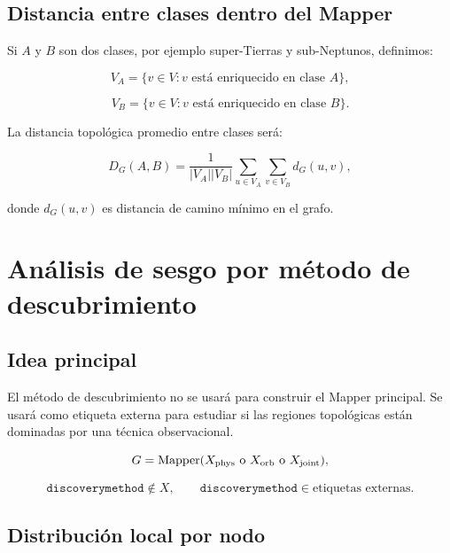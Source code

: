 \documentclass[11pt,letterpaper]{article}
\newcommand{\Mapper}{\operatorname{Mapper}}
\newcommand{\phys}{\rm phys}
\newcommand{\orb}{\rm orb}
\newcommand{\joint}{\rm joint}
\begin{document}
\subsection{Distancia entre clases dentro del Mapper}

Si $A$ y $B$ son dos clases, por ejemplo super-Tierras y sub-Neptunos, definimos:

\begin{equation}
V_A=\{v\in V: v\text{ está enriquecido en clase }A\},
\end{equation}

\begin{equation}
V_B=\{v\in V: v\text{ está enriquecido en clase }B\}.
\end{equation}

La distancia topológica promedio entre clases será:

\begin{equation}
D_G(A,B)=\frac{1}{|V_A||V_B|}\sum_{u\in V_A}\sum_{v\in V_B}d_G(u,v),
\end{equation}

donde $d_G(u,v)$ es distancia de camino mínimo en el grafo.

\section{Análisis de sesgo por método de descubrimiento}

\subsection{Idea principal}

El método de descubrimiento no se usará para construir el Mapper principal. Se usará como etiqueta externa para estudiar si las regiones topológicas están dominadas por una técnica observacional.

\begin{equation}
G=\Mapper(X_{\phys}\text{ o }X_{\orb}\text{ o }X_{\joint}),
\end{equation}

\begin{equation}
\texttt{discoverymethod}\notin X,\qquad \texttt{discoverymethod}\in \text{etiquetas externas}.
\end{equation}

\subsection{Distribución local por nodo}
\end{document}
